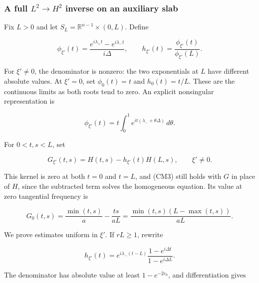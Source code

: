 \documentclass[
  11pt,
]{article}
\makeatletter
\let\ReaderOriginalAnchorStart\hyper@anchorstart
\let\ReaderOriginalAnchorEnd\hyper@anchorend
\let\ReaderPendingAliases\@empty
\def\ReaderArmAliases#1{\gdef\ReaderPendingAliases{#1}}
\def\hyper@anchorstart#1{\ReaderIfNativeAnchorTF{#1}{\ReaderPendingAliases\global\let\ReaderPendingAliases\@empty}{}\ReaderOriginalAnchorStart{#1}}
\makeatother
\begin{document}
\ReaderArmAliases{\ReaderOriginalAnchorStart{cm3-a-full-l-2-to-h-2-inverse-on-an-auxiliary-slab}\ReaderOriginalAnchorEnd\begingroup\expandafter\def\csname @currentHref\endcsname{cm3-a-full-l-2-to-h-2-inverse-on-an-auxiliary-slab}\label{cm3-a-full-l-2-to-h-2-inverse-on-an-auxiliary-slab}\endgroup\ReaderOriginalAnchorStart{a-full-l-2-to-h-2-inverse-on-an-auxiliary-slab}\ReaderOriginalAnchorEnd\begingroup\expandafter\def\csname @currentHref\endcsname{a-full-l-2-to-h-2-inverse-on-an-auxiliary-slab}\label{a-full-l-2-to-h-2-inverse-on-an-auxiliary-slab}\endgroup\ReaderOriginalAnchorStart{a-full-l2to-h2-inverse-on-an-auxiliary-slab}\ReaderOriginalAnchorEnd}
\subsubsection{\texorpdfstring{A full \(L^2\to H^2\) inverse on an
auxiliary
slab}{A full L\^{}2\textbackslash to H\^{}2 inverse on an auxiliary slab}}\label{a-full-l2to-h2-inverse-on-an-auxiliary-slab}

Fix \(L>0\) and let \(S_L=\mathbb R^{n-1}\times(0,L)\). Define

\[
\phi_{\xi'}(t)=\frac{e^{i\lambda_+t}-e^{i\lambda_-t}}{i\Delta},
\qquad h_{\xi'}(t)=\frac{\phi_{\xi'}(t)}{\phi_{\xi'}(L)}.
\tag{CM6}
\]

For \(\xi'\ne0\), the denominator is nonzero: the two exponentials at
\(L\) have different absolute values. At \(\xi'=0\), set \(\phi_0(t)=t\)
and \(h_0(t)=t/L\). These are the continuous limits as both roots tend
to zero. An explicit nonsingular representation is

\[
\phi_{\xi'}(t)
=t\int_0^1 e^{it(\lambda_-+\theta\Delta)}\,d\theta.
\tag{CM7}
\]

For \(0<t,s<L\), set

\[
G_{\xi'}(t,s)=H(t,s)-h_{\xi'}(t)H(L,s),\qquad \xi'\ne0.
\tag{CM8}
\]

This kernel is zero at both \(t=0\) and \(t=L\), and (CM3) still holds
with \(G\) in place of \(H\), since the subtracted term solves the
homogeneous equation. Its value at zero tangential frequency is

\[
G_0(t,s)=\frac{\min(t,s)}a-\frac{ts}{aL}
=\frac{\min(t,s)(L-\max(t,s))}{aL}.
\tag{CM9}
\]

We prove estimates uniform in \(\xi'\). If \(rL\geq1\), rewrite

\[
h_{\xi'}(t)=
e^{i\lambda_-(t-L)}
\frac{1-e^{i\Delta t}}{1-e^{i\Delta L}}.
\tag{CM10}
\]

The denominator has absolute value at least \(1-e^{-2c_0}\), and
differentiation gives
\end{document}
